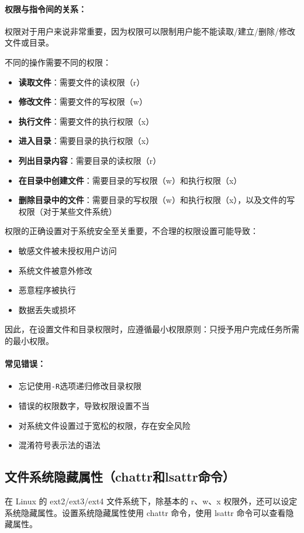 \documentclass[12pt,UTF8]{ctexbook}
\begin{document}
\paragraph{权限与指令间的关系：}
权限对于用户来说非常重要，因为权限可以限制用户能不能读取/建立/删除/修改文件或目录。

不同的操作需要不同的权限：
\begin{itemize}
    \item \textbf{读取文件}：需要文件的读权限（r）
    \item \textbf{修改文件}：需要文件的写权限（w）
    \item \textbf{执行文件}：需要文件的执行权限（x）
    \item \textbf{进入目录}：需要目录的执行权限（x）
    \item \textbf{列出目录内容}：需要目录的读权限（r）
    \item \textbf{在目录中创建文件}：需要目录的写权限（w）和执行权限（x）
    \item \textbf{删除目录中的文件}：需要目录的写权限（w）和执行权限（x），以及文件的写权限（对于某些文件系统）
\end{itemize}

权限的正确设置对于系统安全至关重要，不合理的权限设置可能导致：
\begin{itemize}
    \item 敏感文件被未授权用户访问
    \item 系统文件被意外修改
    \item 恶意程序被执行
    \item 数据丢失或损坏
\end{itemize}

因此，在设置文件和目录权限时，应遵循最小权限原则：只授予用户完成任务所需的最小权限。

\paragraph{常见错误：}
\begin{itemize}
    \item 忘记使用\verb+-R+选项递归修改目录权限
    \item 错误的权限数字，导致权限设置不当
    \item 对系统文件设置过于宽松的权限，存在安全风险
    \item 混淆符号表示法的语法
\end{itemize}

\subsection{文件系统隐藏属性（chattr和lsattr命令）}
在 Linux 的 ext2/ext3/ext4 文件系统下，除基本的 r、w、x 权限外，还可以设定系统隐藏属性。设置系统隐藏属性使用 chattr 命令，使用 lsattr 命令可以查看隐藏属性。
\end{document}
